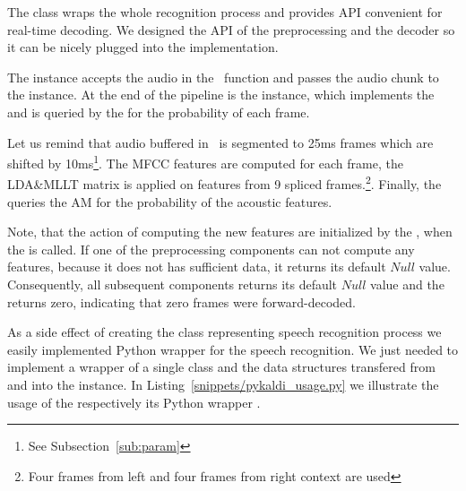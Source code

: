 
The \/ class wraps the whole recognition process
and provides \ac{API} convenient for real-time decoding.
We designed the \ac{API} of the preprocessing and the decoder 
so it can be nicely plugged into the \/ implementation.

The  \/ instance accepts the audio in the~\/
function and passes the audio chunk to the \/ instance.
At the end of the pipeline is the \/ instance,
which implements the~\/ and is queried by the \/
for the probability of each frame.

Let us remind that audio buffered in~ is 
segmented to 25ms frames which are shifted by 10ms\footnote{See Subsection~\ref{sub:param}}.
The \ac{MFCC} features are computed for each frame, the \ac{LDA}\&\ac{MLLT} matrix
is applied on features from 9 spliced frames.\footnote{Four frames from left 
and four frames from right context are used}. 
Finally, the \/ queries the \acl{AM} for the probability of the acoustic features.


Note, that the action of computing the new features are initialized by the ,
when the \/ is called.
If one of the preprocessing components can not compute any features, 
because it does not has sufficient data, it returns its default $Null$ value. 
Consequently, all subsequent components returns its default $Null$ value and 
the \/ returns zero,
indicating that zero frames were forward-decoded.

As a side effect of creating the class \/ representing speech recognition process
we easily implemented Python wrapper for the speech recognition. 
We just needed to implement a wrapper of a single class and the data structures transfered from and into the
\/ instance.
In Listing~\ref{snippets/pykaldi_usage.py} we illustrate the usage of the \/
respectively its Python wrapper .

